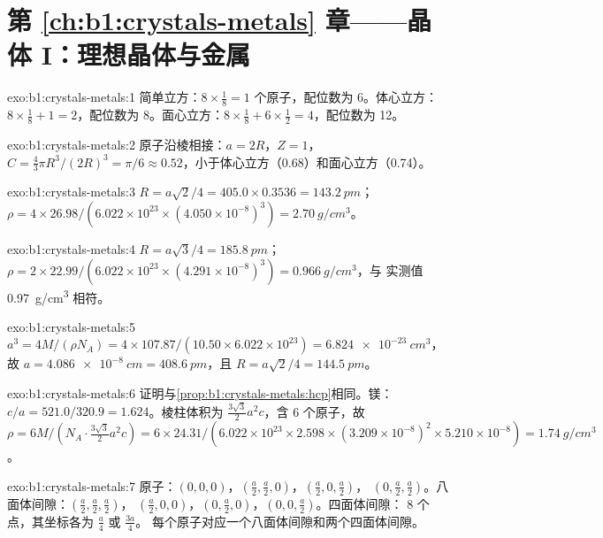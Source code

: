 \section*{第 \ref{ch:b1:crystals-metals} 章——晶体 I：理想晶体与金属}

\begin{solution}{exo:b1:crystals-metals:1}
简单立方：$8 \times \frac18 = 1$ 个原子，配位数为 6。体心立方：$8 \times
\frac18 + 1 = 2$，配位数为 8。面心立方：$8 \times \frac18 + 6 \times
\frac12 = 4$，配位数为 12。
\end{solution}

\begin{solution}{exo:b1:crystals-metals:2}
原子沿棱相接：$a = 2R$，$Z = 1$，$C = \frac43\pi R^3/(2R)^3
= \pi/6 \approx 0.52$，小于体心立方（0.68）和面心立方（0.74）。
\end{solution}

\begin{solution}{exo:b1:crystals-metals:3}
$R = a\sqrt2/4 = 405.0 \times 0.3536 = \qty{143.2}{pm}$；
$\rho = 4 \times 26.98/(6.022 \times 10^{23} \times (4.050 \times
10^{-8})^3) = \qty{2.70}{g/cm^3}$。
\end{solution}

\begin{solution}{exo:b1:crystals-metals:4}
$R = a\sqrt3/4 = \qty{185.8}{pm}$；$\rho = 2 \times 22.99/(6.022 \times
10^{23} \times (4.291 \times 10^{-8})^3) = \qty{0.966}{g/cm^3}$，与
实测值 \qty{0.97}{g/cm^3} 相符。
\end{solution}

\begin{solution}{exo:b1:crystals-metals:5}
$a^3 = 4M/(\rho N_A) = 4 \times 107.87/(10.50 \times 6.022 \times 10^{23}) =
\qty{6.824e-23}{cm^3}$，故 $a = \qty{4.086e-8}{cm} = \qty{408.6}{pm}$，且
$R = a\sqrt2/4 = \qty{144.5}{pm}$。
\end{solution}

\begin{solution}{exo:b1:crystals-metals:6}
证明与\cref{prop:b1:crystals-metals:hcp}相同。镁：
$c/a = 521.0/320.9 = 1.624$。棱柱体积为
$\frac{3\sqrt3}{2}a^2c$，含 6 个原子，故 $\rho = 6M/(N_A \cdot
\frac{3\sqrt3}{2}a^2c) = 6 \times 24.31/(6.022 \times 10^{23} \times
2.598 \times (3.209 \times 10^{-8})^2 \times 5.210 \times 10^{-8}) =
\qty{1.74}{g/cm^3}$。
\end{solution}

\begin{solution}{exo:b1:crystals-metals:7}
原子：$(0,0,0)$，$(\frac a2,\frac a2,0)$，$(\frac a2,0,\frac a2)$，
$(0,\frac a2,\frac a2)$。八面体间隙：$(\frac a2,\frac a2,\frac a2)$，
$(\frac a2,0,0)$，$(0,\frac a2,0)$，$(0,0,\frac a2)$。四面体间隙：
8 个点，其坐标各为 $\frac a4$ 或 $\frac{3a}{4}$。
每个原子对应一个八面体间隙和两个四面体间隙。
\end{solution}


